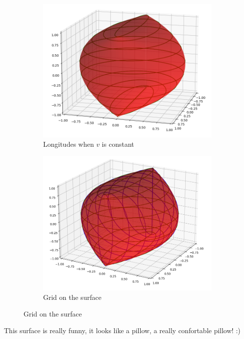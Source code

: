 \begin{figure}[h]
	\begin{subfigure}[b]{0.45\textwidth}
		\centering
		\includegraphics[scale=0.3]{picture3.png}
		\caption{Longitudes when $v$ is constant}
	\end{subfigure}
	\begin{subfigure}[b]{0.45\textwidth}
		\centering	
		\includegraphics[scale=0.3]{picture4.png}
		\caption{Grid on the surface}
	\end{subfigure}
	\end{figure}

	This surface is really funny, it looks like a pillow, a really confortable pillow! :)
	
